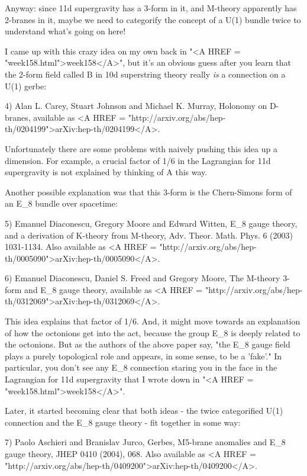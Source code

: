 Anyway: since 11d supergravity has a 3-form in it, and M-theory 
apparently has 2-branes in it, maybe we need to categorify 
the concept of a U(1) bundle twice to understand what's going
on here!

I came up with this crazy idea on my own back in "<A HREF =
"week158.html">week158</A>", but it's an obvious guess after you
learn that the 2-form field called B in 10d superstring theory really
\emph{is} a connection on a U(1) gerbe:

4) Alan L. Carey, Stuart Johnson and Michael K. Murray,
Holonomy on D-branes, available as <A HREF = "http://arxiv.org/abs/hep-th/0204199">arXiv:hep-th/0204199</A>.

Unfortunately there are some problems with naively pushing
this idea up a dimension.  For example, a crucial factor of 
1/6 in the Lagrangian for 11d supergravity is not explained 
by thinking of A this way.

Another possible explanation was that this 3-form is the 
Chern-Simons form of an E_{8} bundle over spacetime:

5) Emanuel Diaconescu, Gregory Moore and Edward Witten,
E_{8} gauge theory, and a derivation of K-theory from M-theory,
Adv. Theor. Math. Phys. 6 (2003) 1031-1134.  Also available as 
<A HREF = "http://arxiv.org/abs/hep-th/0005090">arXiv:hep-th/0005090</A>.

6) Emanuel Diaconescu, Daniel S. Freed and Gregory Moore,
The M-theory 3-form and E_{8} gauge theory, available as
<A HREF = "http://arxiv.org/abs/hep-th/0312069">arXiv:hep-th/0312069</A>.

This idea explains that factor of 1/6.  And, it might move towards an
explanation of how the octonions get into the act, because the group
E_{8} is deeply related to the octonions.  But as the authors
of the above paper say, "the E_{8} gauge field plays a
purely topological role and appears, in some sense, to be a
'fake'." In particular, you don't see any E_{8}
connection staring you in the face in the Lagrangian for 11d
supergravity that I wrote down in "<A HREF =
"week158.html">week158</A>".

Later, it started becoming clear that both ideas - the twice 
categorified U(1) connection and the E_{8} gauge theory - fit 
together in some way:

7) Paolo Aschieri and Branislav Jurco, Gerbes, M5-brane 
anomalies and E_{8} gauge theory, JHEP 0410 (2004), 068.
Also available as <A HREF = "http://arxiv.org/abs/hep-th/0409200">arXiv:hep-th/0409200</A>.

